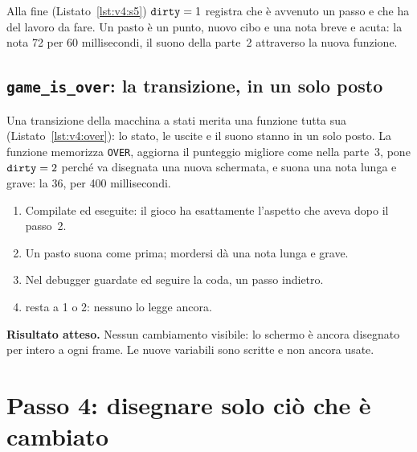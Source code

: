 

Alla fine (Listato~\ref{lst:v4:s5}) $\texttt{dirty}=1$ registra che è avvenuto
un passo e che  ha del lavoro da fare. Un pasto è un punto, nuovo
cibo e una nota breve e acuta: la nota 72 per 60 millisecondi, il suono della
parte~2 attraverso la nuova funzione.

\subsection{\texttt{game\_is\_over}: la transizione, in un solo posto}


Una transizione della macchina a stati merita una funzione tutta sua
(Listato~\ref{lst:v4:over}): lo stato, le uscite e il suono stanno in un solo
posto. La funzione memorizza \texttt{OVER}, aggiorna il punteggio migliore
come nella parte~3, pone $\texttt{dirty}=2$ perché va disegnata una nuova
schermata, e suona una nota lunga e grave: la 36, per 400 millisecondi.

\begin{prgcheck}
\begin{enumerate}[nosep]
\item Compilate ed eseguite: il gioco ha esattamente l'aspetto che aveva dopo
  il passo~2.
\item Un pasto suona come prima; mordersi dà una nota lunga e grave.
\item Nel debugger guardate  ed  seguire la
  coda, un passo indietro.
\item {} resta a 1 o 2: nessuno lo legge ancora.
\end{enumerate}
\textbf{Risultato atteso.} Nessun cambiamento visibile: lo schermo è ancora
disegnato per intero a ogni frame. Le nuove variabili sono scritte e non
ancora usate.
\end{prgcheck}

\section{Passo 4: disegnare solo ciò che è cambiato}

